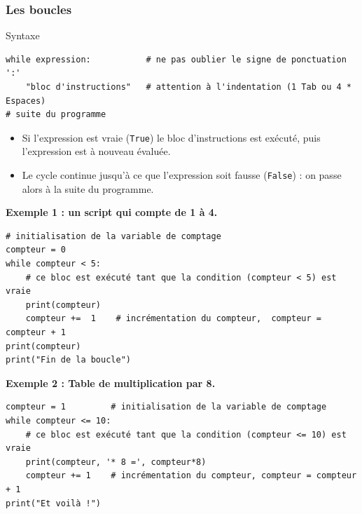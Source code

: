 \documentclass{beamer}
\begin{document}
\begin{frame}
\frametitle{Les boucles}



\begin{block}{Syntaxe }

\begin{verbatim}
while expression:           # ne pas oublier le signe de ponctuation ':'
    "bloc d'instructions"   # attention à l'indentation (1 Tab ou 4 * Espaces)
# suite du programme
\end{verbatim}
\begin{itemize}
\item Si l'expression est vraie (\texttt{True}) le bloc d'instructions est exécuté, puis l'expression est à nouveau évaluée.

\item Le cycle continue jusqu'à ce que l'expression soit fausse (\texttt{False}) : on passe alors à la suite du programme.
\end{itemize}

\noindent
\end{block}

\end{frame}

\begin{frame}

\noindent\textbf{Exemple 1 : un script qui compte de 1 à 4.}
\begin{verbatim}
# initialisation de la variable de comptage
compteur = 0
while compteur < 5:
    # ce bloc est exécuté tant que la condition (compteur < 5) est vraie
    print(compteur)
    compteur +=  1    # incrémentation du compteur,  compteur = compteur + 1
print(compteur)
print("Fin de la boucle")
\end{verbatim}
\end{frame}

\begin{frame}

\noindent\textbf{Exemple 2 : Table de multiplication par 8.}
\begin{verbatim}
compteur = 1         # initialisation de la variable de comptage
while compteur <= 10:
    # ce bloc est exécuté tant que la condition (compteur <= 10) est vraie
    print(compteur, '* 8 =', compteur*8)
    compteur += 1    # incrémentation du compteur, compteur = compteur + 1
print("Et voilà !")
\end{verbatim}
\end{frame}
\end{document}
